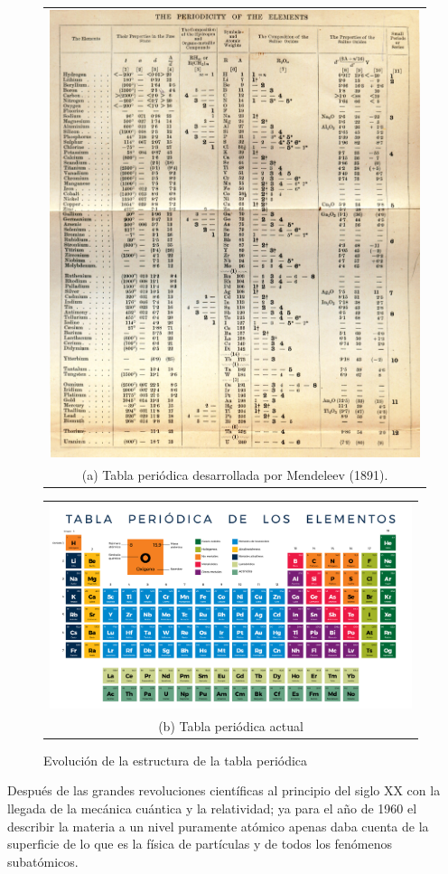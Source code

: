 \documentclass[journal]{IEEEtran}
\begin{document}
\begin{figure}[!htb]
  \centering
  \begin{tabular}{@{}c@{}}
    \includegraphics[width=.9\linewidth,height=8 cm
    ]{Mendeleev_Table_5th_II.jpg} \\[\abovecaptionskip]
    \small (a) Tabla periódica desarrollada por Mendeleev (1891).
  \end{tabular}
  \vspace{\floatsep}
  \begin{tabular}{@{}c@{}}
    \includegraphics[width=.9\linewidth,height=6cm]{tabla-periodica2.png} \\[\abovecaptionskip]
    \small (b) Tabla periódica actual
  \end{tabular}
  \caption{Evolución de la estructura de la tabla periódica}
\label{T Periodica}
\end{figure}


Después de las grandes revoluciones científicas al principio del siglo XX con la llegada de la mecánica cuántica y la relatividad; ya para el año de 1960 el describir la materia a un nivel puramente atómico apenas daba cuenta de la superficie de lo que es la física de partículas y de todos los fenómenos subatómicos.
\end{document}
